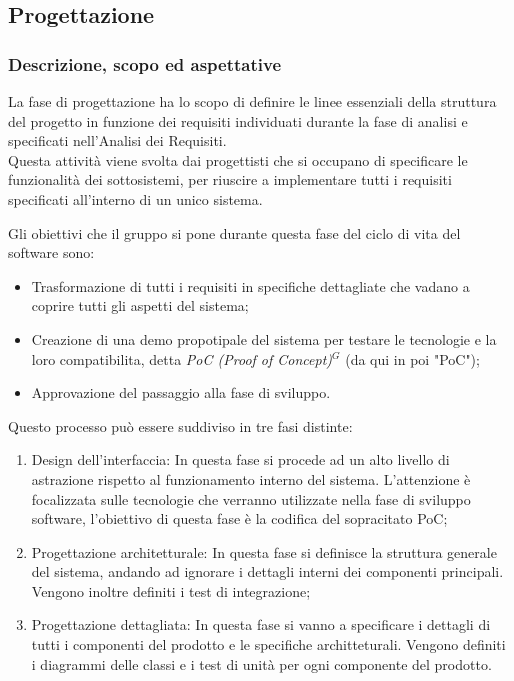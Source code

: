\subsection{Progettazione}

\subsubsection{Descrizione, scopo ed aspettative}
La fase di progettazione ha lo scopo di definire le linee essenziali della struttura del progetto in funzione dei requisiti individuati durante la fase di analisi e specificati nell’Analisi dei Requisiti. \\
Questa attività viene svolta dai progettisti che si occupano di specificare le funzionalità dei sottosistemi, per riuscire a implementare tutti i requisiti specificati all'interno di un unico sistema.

Gli obiettivi che il gruppo si pone durante questa fase del ciclo di vita del software sono:
\begin{itemize}
    \item Trasformazione di tutti i requisiti in specifiche dettagliate che vadano a coprire tutti gli aspetti del sistema;
    \item Creazione di una demo propotipale del sistema per testare le tecnologie e la loro compatibilita, detta \emph{PoC (Proof of Concept)}$^{G}$ (da qui in poi "PoC");
    \item Approvazione del passaggio alla fase di sviluppo.
\end{itemize}

Questo processo può essere suddiviso in tre fasi distinte:
\begin{enumerate}
    \item Design dell'interfaccia: In questa fase si procede ad un alto livello di astrazione rispetto al funzionamento interno del sistema. L'attenzione è focalizzata sulle tecnologie che verranno utilizzate nella fase di sviluppo software, l'obiettivo di questa fase è la codifica del sopracitato PoC;
    \item Progettazione architetturale: In questa fase si definisce la struttura generale del sistema, andando ad ignorare i dettagli interni dei componenti principali. Vengono inoltre definiti i test di integrazione;
    \item Progettazione dettagliata: In questa fase si vanno a specificare i dettagli di tutti i componenti del prodotto e le specifiche architteturali. Vengono definiti i diagrammi delle classi e i test di unità per ogni componente del prodotto.
\end{enumerate}
